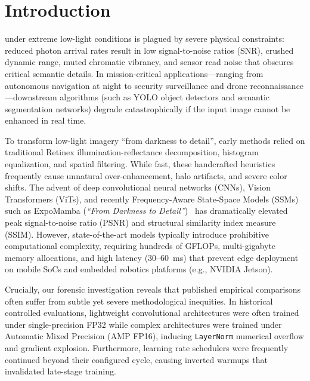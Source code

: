 \documentclass[journal,onecolumn,11pt]{IEEEtran}
\begin{document}
\section{Introduction}
 under extreme low-light conditions is plagued by severe physical constraints: reduced photon arrival rates result in low signal-to-noise ratios (SNR), crushed dynamic range, muted chromatic vibrancy, and sensor read noise that obscures critical semantic details. In mission-critical applications---ranging from autonomous navigation at night to security surveillance and drone reconnaissance---downstream algorithms (such as YOLO object detectors and semantic segmentation networks) degrade catastrophically if the input image cannot be enhanced in real time.

To transform low-light imagery ``from darkness to detail'', early methods relied on traditional Retinex illumination-reflectance decomposition, histogram equalization, and spatial filtering. While fast, these handcrafted heuristics frequently cause unnatural over-enhancement, halo artifacts, and severe color shifts. The advent of deep convolutional neural networks (CNNs), Vision Transformers (ViTs), and recently Frequency-Aware State-Space Models (SSMs) such as ExpoMamba (\textit{``From Darkness to Detail''})~\cite{adhikarla2025darkness} has dramatically elevated peak signal-to-noise ratio (PSNR) and structural similarity index measure (SSIM). However, state-of-the-art models typically introduce prohibitive computational complexity, requiring hundreds of GFLOPs, multi-gigabyte memory allocations, and high latency (30--60~ms) that prevent edge deployment on mobile SoCs and embedded robotics platforms (e.g., NVIDIA Jetson).

Crucially, our forensic investigation reveals that published empirical comparisons often suffer from subtle yet severe methodological inequities. In historical controlled evaluations, lightweight convolutional architectures were often trained under single-precision FP32 while complex architectures were trained under Automatic Mixed Precision (AMP FP16), inducing \texttt{LayerNorm} numerical overflow and gradient explosion. Furthermore, learning rate schedulers were frequently continued beyond their configured cycle, causing inverted warmups that invalidated late-stage training.
\end{document}
